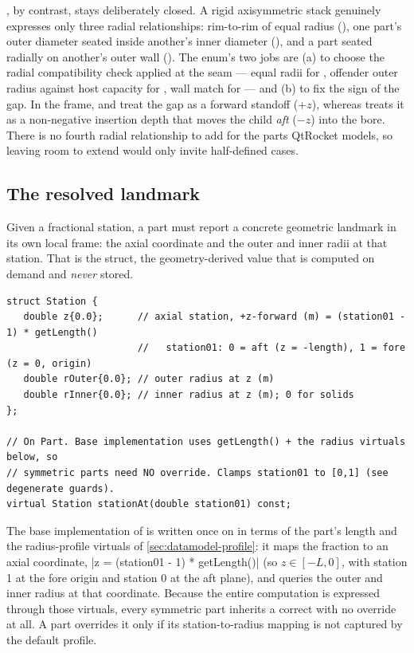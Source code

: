 , by contrast, stays deliberately closed. A rigid axisymmetric stack genuinely
expresses only three radial relationships: rim-to-rim of equal radius (), one part's
outer diameter seated inside another's inner diameter (), and a part seated
radially on another's outer wall (). The enum's two jobs are (a) to choose the
radial compatibility check applied at the seam --- equal radii for , offender outer
radius against host capacity for , wall match for  --- and (b) to
fix the sign of the gap. In the \zfwd{} frame,  and  treat the gap as a
forward standoff ($+z$), whereas  treats it as a non-negative insertion depth that
moves the child \emph{aft} ($-z$) into the bore. There is no fourth radial relationship to add for
the parts QtRocket models, so leaving room to extend would only invite half-defined cases.

\subsection{The resolved landmark}\label{sec:datamodel-station}

Given a fractional station, a part must report a concrete geometric landmark in its own
\zfwd{} local frame: the axial coordinate and the outer and inner radii at that station. That is the
 struct, the geometry-derived value that is computed on demand and \emph{never}
stored.

\begin{listing}[htbp]
\begin{verbatim}
struct Station {
   double z{0.0};      // axial station, +z-forward (m) = (station01 - 1) * getLength()
                       //   station01: 0 = aft (z = -length), 1 = fore (z = 0, origin)
   double rOuter{0.0}; // outer radius at z (m)
   double rInner{0.0}; // inner radius at z (m); 0 for solids
};

// On Part. Base implementation uses getLength() + the radius virtuals below, so
// symmetric parts need NO override. Clamps station01 to [0,1] (see degenerate guards).
virtual Station stationAt(double station01) const;
\end{verbatim}
\caption{The derived  landmark and the base  virtual.}\label{lst:station}
\end{listing}

The base implementation of  is written once on  in terms of the part's
length and the radius-profile virtuals of \cref{sec:datamodel-profile}: it maps the fraction to an
axial coordinate, \cppinline|z = (station01 - 1) * getLength()| (so $z \in [-L, 0]$, with station 1 at the
fore origin and station 0 at the aft plane), and queries the outer and inner radius at
that coordinate. Because the entire computation is expressed through those virtuals, every
symmetric part inherits a correct  with no override at all. A part overrides it only
if its station-to-radius mapping is not captured by the default profile.

